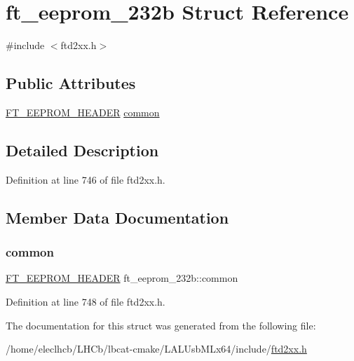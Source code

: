 \hypertarget{structft__eeprom__232b}{}\section{ft\+\_\+eeprom\+\_\+232b Struct Reference}
\label{structft__eeprom__232b}


{\ttfamily \#include $<$ftd2xx.\+h$>$}

\subsection*{Public Attributes}
\begin{DoxyCompactItemize}
\item 
\hyperlink{LALUsbMLx64_2include_2ftd2xx_8h_ad5a6f519cd67a403fd8742756462394e}{F\+T\+\_\+\+E\+E\+P\+R\+O\+M\+\_\+\+H\+E\+A\+D\+ER} \hyperlink{structft__eeprom__232b_ad20111a2bbd898f3e5e8e0f780e8d7cf}{common}
\end{DoxyCompactItemize}


\subsection{Detailed Description}


Definition at line 746 of file ftd2xx.\+h.



\subsection{Member Data Documentation}
\mbox{\label{structft__eeprom__232b_ad20111a2bbd898f3e5e8e0f780e8d7cf}} 
\subsubsection{\texorpdfstring{common}{common}}
{\footnotesize\ttfamily \hyperlink{LALUsbMLx64_2include_2ftd2xx_8h_ad5a6f519cd67a403fd8742756462394e}{F\+T\+\_\+\+E\+E\+P\+R\+O\+M\+\_\+\+H\+E\+A\+D\+ER} ft\+\_\+eeprom\+\_\+232b\+::common}



Definition at line 748 of file ftd2xx.\+h.



The documentation for this struct was generated from the following file\+:\begin{DoxyCompactItemize}
\item 
/home/eleclhcb/\+L\+H\+Cb/lbcat-\/cmake/\+L\+A\+L\+Usb\+M\+Lx64/include/\hyperlink{LALUsbMLx64_2include_2ftd2xx_8h}{ftd2xx.\+h}\end{DoxyCompactItemize}
